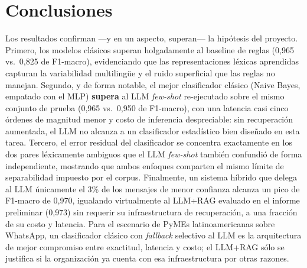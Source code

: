 \documentclass[journal]{IEEEtran}
\begin{document}
\section{Conclusiones}
Los resultados confirman ---y en un aspecto, superan--- la hip\'otesis del
proyecto. Primero, los modelos cl\'asicos superan holgadamente al baseline de
reglas (0{,}965 vs.\ 0{,}825 de F1-macro), evidenciando que las representaciones
l\'exicas aprendidas capturan la variabilidad multiling\"ue y el ruido
superficial que las reglas no manejan. Segundo, y de forma notable, el mejor
clasificador cl\'asico (Naive Bayes, empatado con el MLP) \textbf{supera} al LLM
\emph{few-shot} re-ejecutado sobre el mismo conjunto de prueba (0{,}965 vs.\
0{,}950 de F1-macro), con una latencia casi cinco \'ordenes de magnitud menor y
costo de inferencia despreciable: sin recuperaci\'on aumentada, el LLM no
alcanza a un clasificador estad\'istico bien dise\~nado en esta tarea. Tercero,
el error residual del clasificador se concentra exactamente en los dos pares
l\'exicamente ambiguos que el LLM \emph{few-shot} tambi\'en confundi\'o de forma
independiente, mostrando que ambos enfoques comparten el mismo l\'imite de
separabilidad impuesto por el corpus. Finalmente, un sistema h\'ibrido que
delega al LLM \'unicamente el 3\% de los mensajes de menor confianza alcanza un
pico de F1-macro de 0{,}970, igualando virtualmente al LLM+RAG evaluado en el
informe preliminar (0{,}973) sin requerir su infraestructura de recuperaci\'on, a
una fracci\'on de su costo y latencia. Para el escenario de PyMEs
latinoamericanas sobre WhatsApp, un clasificador cl\'asico con \emph{fallback}
selectivo al LLM es la arquitectura de mejor compromiso entre exactitud,
latencia y costo; el LLM+RAG s\'olo se justifica si la organizaci\'on ya cuenta
con esa infraestructura por otras razones.

\end{document}
